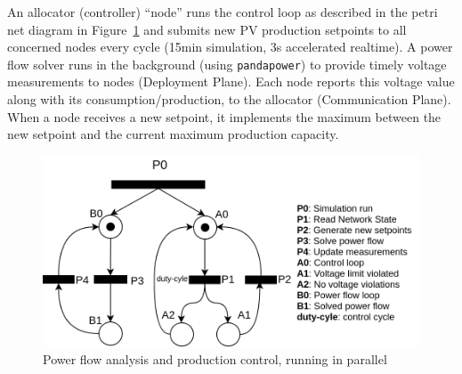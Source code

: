 \documentclass[conference]{IEEEtran}
\newcommand{\Algorithmicbreak}{\textbf{break}}
\newcommand{\BREAK}{\STATE \Algorithmicbreak}
\begin{document}
An allocator (controller) ``node'' runs the control loop as described in the petri net\cite{petersonPetriNets1977} diagram in Figure~\ref{pp_pi} and submits new PV production setpoints to all concerned nodes every cycle (15min simulation, 3s accelerated realtime). A power flow solver runs in the background (using \texttt{pandapower}) to provide timely voltage measurements to nodes (Deployment Plane). Each node reports this voltage value along with its consumption/production, to the allocator (Communication Plane). When a node receives a new setpoint, it implements the maximum between the new setpoint and the current maximum production capacity.






\begin{figure}[htp]
	\centering
	\includegraphics[width=\linewidth]{figs/pandapower.png}
	\caption{Power flow analysis and production control, running in parallel}
	\label{pp_pi}
\end{figure}
\end{document}

